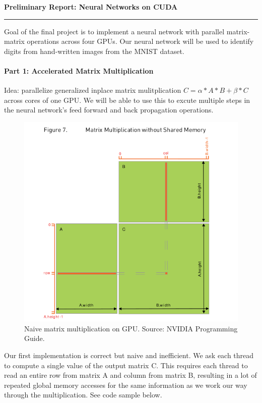\documentclass[12pt,letterpaper,twoside]{article}
\begin{document}
{\centering \textbf{Preliminary Report: Neural Networks on CUDA\\}}
\vspace*{-8pt}\noindent\rule{\linewidth}{1pt}

Goal of the final project is to implement a neural network with parallel 
matrix-matrix operations across four GPUs. Our neural network will be used
to identify digits from hand-written images from the MNIST dataset.

\paragraph{Part 1: Accelerated Matrix Multiplication} Idea: parallelize generalized
inplace matrix mulitplication $C = \alpha*A*B + \beta*C$ across cores of one GPU. We 
will be able to use this to excute multiple steps in the neural network's feed forward 
and back propagation operations.

\begin{figure}[!htbp]
    \centering
    \includegraphics[scale=0.7]{gemm_naive.png}
    \caption{Naive matrix multiplication on GPU. Source: NVIDIA Programming Guide.}
\end{figure}

Our first implementation is correct but naive and inefficient. We ask each thread to 
compute a single value of the output matrix C. This requires each thread to read an 
entire row from matrix A and column from matrix B, resulting in a lot of repeated 
global memory accesses for the same information as we work our way through the 
multiplication. See code sample below.
\end{document}
